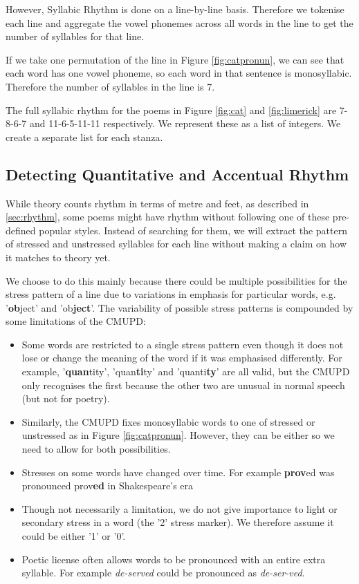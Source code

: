 However, Syllabic Rhythm is done on a line-by-line basis. Therefore we tokenise each line and aggregate the vowel phonemes across all words in the line to get the number of syllables for that line.

If we take one permutation of the line in Figure \ref{fig:catpronun}, we can see that each word has one vowel phoneme, so each word in that sentence is monosyllabic. Therefore the number of syllables in the line is 7.

The full syllabic rhythm for the poems in Figure \ref{fig:cat} and \ref{fig:limerick} are 7-8-6-7 and 11-6-5-11-11 respectively. We represent these as a list of integers. We create a separate list for each stanza.

\subsection{Detecting Quantitative and Accentual Rhythm}

While theory counts rhythm in terms of metre and feet, as described in \ref{sec:rhythm}, some poems might have rhythm without following one of these pre-defined popular styles. Instead of searching for them, we will extract the pattern of stressed and unstressed syllables for each line without making a claim on how it matches to theory yet.

We choose to do this mainly because there could be multiple possibilities for the stress pattern of a line due to variations in emphasis for particular words, e.g. '\textbf{ob}ject' and 'ob\textbf{ject}'. The variability of possible stress patterns is compounded by some limitations of the CMUPD:
\begin{itemize}
\item{Some words are restricted to a single stress pattern even though it does not lose or change the meaning of the word if it was emphasised differently. For example, '\textbf{quan}tity', 'quan\textbf{ti}ty' and 'quanti\textbf{ty}' are all valid, but the CMUPD only recognises the first because the other two are unusual in normal speech (but not for poetry).}
\item{Similarly, the CMUPD fixes monosyllabic words to one of stressed or unstressed as in Figure \ref{fig:catpronun}. However, they can be either so we need to allow for both possibilities.}
\item{Stresses on some words have changed over time. For example \textbf{prov}ed was pronounced prov\textbf{ed} in Shakespeare's era}
\item{Though not necessarily a limitation, we do not give importance to light or secondary stress in a word (the '2' stress marker). We therefore assume it could be either '1' or '0'.}
\item{Poetic license often allows words to be pronounced with an entire extra syllable. For example \textit{de-served} could be pronounced as \textit{de-ser-ved}.}
\end{itemize}

